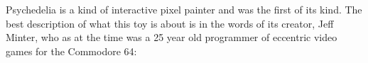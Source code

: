 \begin{figure}[H]
    \begin{adjustbox}{width=10cm,center}
      \hspace{0.1cm}
    \end{adjustbox}
\end{figure}

Psychedelia is a kind of interactive pixel painter and was the first of its kind. 
The best description of what this toy is about is in the words of its creator, Jeff Minter, who as at the time was
a 25 year old programmer of eccentric video games for the Commodore 64:

